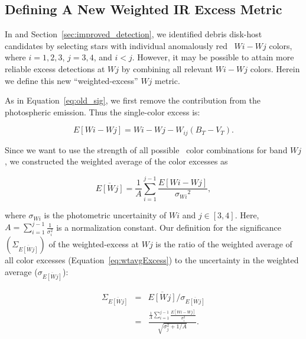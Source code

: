     \subsection{Defining A New Weighted IR Excess Metric}
        \label{sec:metric}
     
        In  and Section~\ref{sec:improved_detection}, we identified debris disk-host candidates by selecting stars with individual anomalously red \WS\ $Wi-Wj$ colors, where $i=1,2,3$, $j=3,4$, and $i<j$. However, it may be possible to attain more reliable excess detections at $Wj$ by combining all relevant $Wi-Wj$ colors. Herein we define this new ``weighted-excess'' $Wj$ metric.
        
        As in Equation~\ref{eq:old_sig}, we first remove the contribution from the photospheric emission. Thus the single-color excess is: 

\begin{equation}\label{eq:excess_1}
        E[Wi-Wj] = Wi-Wj-W_{ij}(B_T-V_T). 
\end{equation}

\noindent Since we want to use the strength of all possible \WS\ color combinations for band $Wj$, we constructed the weighted average of the color excesses as

\begin{equation}\label{eq:wtavgExcess}
        \overline{E[Wj]} = \frac{1}{A} \sum\limits_{i=1}^{j-1} \frac{E[Wi-Wj]}{{\sigma_{Wi}}^2},
\end{equation}

\noindent where $\sigma_{Wi}$ is the photometric uncertainity of $Wi$ and $j \in [3,4]$.  Here, $A=\sum\limits_{i=1}^{j-1} \frac{1}{\sigma_{i}^2}$ is a normalization constant. Our definition for the significance $\left(\Sigma_{\overline{E[Wj]}}\right)$ of the weighted-excess at $Wj$ is the ratio of the weighted average of all color excesses (Equation~\ref{eq:wtavgExcess}) to the uncertainty in the weighted average ($\sigma_{\overline{E[Wj]}}$):

\begin{eqnarray}\label{eq:combined_significance}
    \Sigma_{\overline{E[Wj]}} &=& \overline{E[Wj]}/\sigma_{\overline{E[Wj]}}\\
            &=& \frac{\frac{1}{A}\sum\limits_{i=1}^{j-1}\frac{E[Wi-Wj]}{\sigma_i^2}}{\sqrt{\sigma_j^2 + 1/A}} . 
\end{eqnarray}

